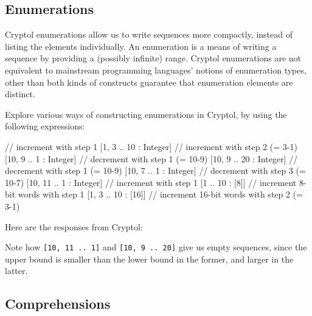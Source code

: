 \subsection{Enumerations}\indEnum
\label{sec:enumerations}

Cryptol enumerations allow us to write sequences more compactly,
instead of listing the elements individually.  An enumeration is a
means of writing a sequence by providing a (possibly infinite) range.
Cryptol enumerations are not equivalent to mainstream programming
languages' notions of enumeration types, other than both kinds of
constructs guarantee that enumeration elements are distinct.

\begin{Exercise}\label{ex:seq:3}
  Explore various ways of constructing enumerations in Cryptol, by
  using the following expressions:
\restartrepl
\begin{replinVerb}
  [1 .. 10 : Integer]            // increment with step 1
  [1, 3 .. 10 : Integer]         // increment with step 2 (= 3-1)
  [10, 9 .. 1 : Integer]         // decrement with step 1 (= 10-9)
  [10, 9 .. 20 : Integer]        // decrement with step 1 (= 10-9)
  [10, 7 .. 1 : Integer]         // decrement with step 3 (= 10-7)
  [10, 11 .. 1 : Integer]        // increment with step 1
  [1 .. 10 : [8]]                // increment 8-bit words with step 1
  [1, 3 .. 10 : [16]]            // increment 16-bit words with step 2 (= 3-1)
\end{replinVerb}
\end{Exercise}
\begin{Answer}
Here are the responses from Cryptol:
\begin{reploutVerb}
  [1, 2, 3, 4, 5, 6, 7, 8, 9, 10]
  [1, 3, 5, 7, 9]
  [10, 9, 8, 7, 6, 5, 4, 3, 2, 1]
  []
  [10, 7, 4, 1]
  []
  [0x01, 0x02, 0x03, 0x04, 0x05, 0x06, 0x07, 0x08, 0x09, 0x0a]
  [0x0001, 0x0003, 0x0005, 0x0007, 0x0009]
\end{reploutVerb}
Note how \texttt{[10, 11 ..\ 1]} and \texttt{[10, 9 ..\ 20]} give us empty
sequences, since the upper bound is smaller than the lower bound in
the former, and larger in the latter.
\end{Answer}

\subsection{Comprehensions}\indComp
\label{sec:comprehensions}


